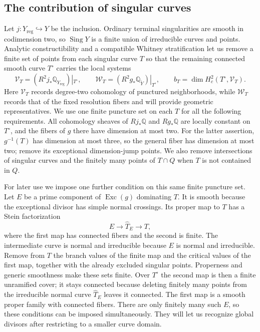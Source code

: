 \documentclass[11pt]{amsart}
\theoremstyle{definition}
\theoremstyle{remark}
\numberwithin{equation}{section}
\newcommand{\Q}{\mathbb{Q}}
\DeclareMathOperator{\Exc}{Exc}
\DeclareMathOperator{\Sing}{Sing}
\begin{document}
\subsection{The contribution of singular curves}

Let $j\colon Y_{\mathrm{reg}}\hookrightarrow Y$ be the inclusion.
Ordinary terminal singularities are smooth in codimension two, so
$\Sing Y$ is a finite union of irreducible curves and points.  Analytic
constructibility and a compatible Whitney stratification let us
remove a finite set of points from each singular curve $T$ so that
the remaining connected smooth curve $T^\circ$ carries the local
systems
\begin{equation}\label{eq:branch-local-systems}
 \mathcal V_T=(R^2j_*\Q_{Y_{\mathrm{reg}}})|_{T^\circ},\qquad
 \mathcal W_T=(R^2g_*\Q_{\widetilde Y})|_{T^\circ},\qquad
 b_T=\dim H_c^2(T^\circ,\mathcal V_T).
\end{equation}
Here $\mathcal V_T$ records degree-two cohomology of punctured
neighborhoods, while $\mathcal W_T$ records that of the fixed
resolution fibers and will provide geometric representatives.
We use one finite puncture set on each $T$ for all the following
requirements.  All cohomology sheaves of $Rj_*\Q$ and $Rg_*\Q$ are
locally constant on $T^\circ$, and the fibers of $g$ there have
dimension at most two.  For the latter assertion,
$g^{-1}(T)$ has dimension at most three, so the general fiber has
dimension at most two; remove its exceptional dimension-jump points.
We also remove intersections of singular curves and the finitely
many points of $T\cap Q$ when $T$ is not contained in $Q$.

For later use we impose one further condition on this same finite
puncture set.  Let $E$ be a prime component of $\Exc(g)$ dominating
$T$.  It is smooth because the exceptional divisor has simple normal
crossings.  Its proper map to $T$ has a Stein factorization
\[
 E\longrightarrow\widehat T_E\longrightarrow T,
\]
where the first map has connected fibers and the second is finite.
The intermediate curve is normal and irreducible because $E$ is
normal and irreducible.  Remove from $T$ the branch values of the
finite map and the critical values of the first map, together with
the already excluded singular points.  Properness and generic
smoothness make these sets finite.  Over $T^\circ$ the second map
is then a finite unramified cover; it stays connected because deleting
finitely many points from the irreducible normal curve
$\widehat T_E$ leaves it connected.  The first map is a smooth proper
family with connected fibers.  There are only finitely many
such $E$, so these conditions can be imposed simultaneously.  They
will let us recognize global divisors after restricting to a smaller
curve domain.
\end{document}
